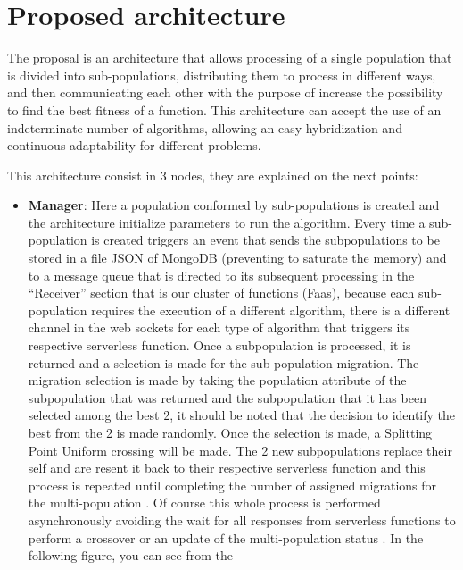 \documentclass[runningheads]{llncs}
\begin{document}
\section{Proposed architecture}
\label{sec:architecture}

The proposal is an architecture that allows processing of a single population
that is divided into sub-populations, distributing them to process in different
ways, and then communicating each other with the purpose of increase the
possibility to find the best fitness of a function. This architecture can accept
the use of an indeterminate number of algorithms, allowing an easy hybridization
and continuous adaptability for different problems.

This architecture consist in 3 nodes, they are explained on the next points:

\begin{itemize}
  \item {\bf Manager}: 
  Here a population conformed by sub-populations is created and the architecture
  initialize parameters to run the algorithm. Every time a sub-population is
  created triggers an event that sends the subpopulations to be stored in a file
  JSON of MongoDB (preventing to saturate the memory) and to a message queue
  that is directed to its subsequent processing in the “Receiver” section that
  is our cluster of functions (Faas), because each sub-population requires the
  execution of a different algorithm, there is a different channel in the web
  sockets for each type of algorithm that triggers its respective serverless
  function. Once a subpopulation is processed, it is returned and a selection is
  made for the sub-population migration. The migration selection is made by
  taking the population attribute of the subpopulation that was returned and the
  subpopulation that it has been selected among the best 2, it should be noted
  that the decision to identify the best from the 2 is made randomly. Once the
  selection is made, a Splitting Point Uniform crossing will be made. The 2 new
  subpopulations replace their self and are resent it back to their respective
  serverless function and this process is repeated until completing the number
  of assigned migrations for the multi-population
  \cite{Ma2019,Santander-jim2018}. Of course this whole process is performed
  asynchronously avoiding the wait for all responses from serverless functions
  to perform a crossover or an update of the multi-population status
  \cite{Lovbjerg2001,Jimeno2019}. In the following figure, you can see from the

\end{itemize}
\end{document}
